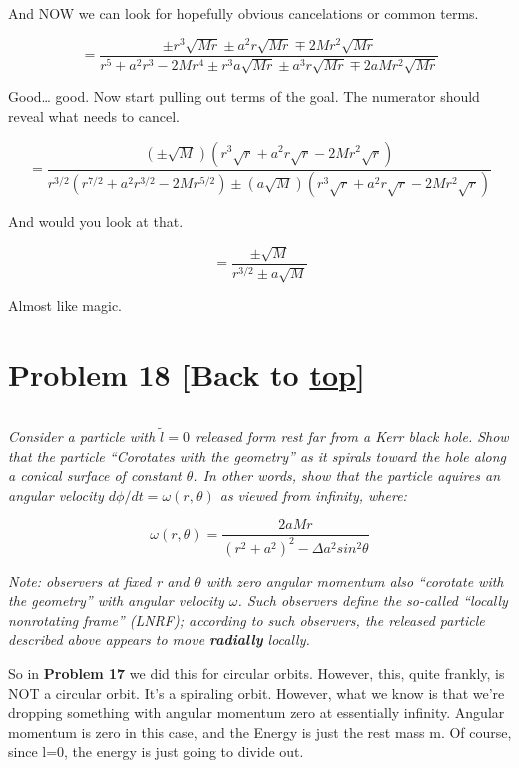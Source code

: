 \documentclass[landscape,letterpaper,10pt,english]{article}
\begin{document}
And NOW we can look for hopefully obvious cancelations or common terms.

    \[ = \frac{ \pm r^3\sqrt{Mr} \pm a^2r\sqrt{Mr} \mp 2Mr^2\sqrt{Mr} }{r^5 + a^2r^3 - 2Mr^4 \pm r^3a\sqrt{Mr} \pm a^3r\sqrt{Mr} \mp 2aMr^2\sqrt{Mr}}\]

Good\ldots{} good. Now start pulling out terms of the goal. The
numerator should reveal what needs to cancel.

    \[ = \frac{ (\pm \sqrt{M})(r^3\sqrt{r} + a^2r\sqrt{r} - 2Mr^2\sqrt{r}) }{r^{3/2}(r^{7/2} + a^2r^{3/2} - 2Mr^{5/2}) \pm ( a\sqrt{M})(r^3\sqrt{r} + a^2r\sqrt{r} - 2Mr^2\sqrt{r})}\]

And would you look at that.

\[ = \frac{ \pm \sqrt{M} }{r^{3/2} \pm a\sqrt{M}}\]

Almost like magic.

    \hypertarget{problem-18-back-to-top}{%
\section{\texorpdfstring{Problem 18 {[}Back to
\hyperref[toc]{top}{]}}{Problem 18 {[}Back to {]}}}\label{problem-18-back-to-top}}

\[\label{P18}\]

\emph{Consider a particle with \(\tilde l=0\) released form rest far
from a Kerr black hole. Show that the particle ``Corotates with the
geometry'' as it spirals toward the hole along a conical surface of
constant \(\theta\). In other words, show that the particle aquires an
angular velocity \(d \phi / d t = \omega(r,\theta)\) as viewed from
infinity, where:}

\[ \omega(r,\theta) = \frac{2aMr}{(r^2+a^2)^2 - \Delta a^2sin^2\theta} \]

\emph{Note: observers at fixed r and \(\theta\) with zero angular
momentum also ``corotate with the geometry'' with angular velocity
\(\omega\). Such observers define the so-called ``locally nonrotating
frame'' (LNRF); according to such observers, the released particle
described above appears to move \textbf{radially} locally.}

    So in \textbf{Problem 17} we did this for circular orbits. However,
this, quite frankly, is NOT a circular orbit. It's a spiraling orbit.
However, what we know is that we're dropping something with angular
momentum zero at essentially infinity. Angular momentum is zero in this
case, and the Energy is just the rest mass m. Of course, since l=0, the
energy is just going to divide out.
\end{document}
